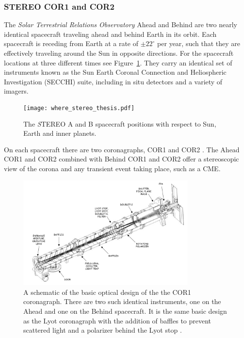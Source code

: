 \subsubsection{STEREO COR1 and COR2}\label{sec:22}
The \emph{Solar Terrestrial Relations Observatory} \citep[\emph{STEREO};][]{kai08} Ahead and Behind are two nearly identical spacecraft traveling ahead and behind Earth in its orbit. Each spacecraft is receding from Earth at a rate of $\pm22^{\circ}$ per year, such that they are effectively traveling around the Sun in opposite directions. For the spacecraft locations at three different times see Figure~\ref{fig:where_str}. They carry an identical set of instruments known as the Sun Earth Coronal Connection and Heliospheric Investigation (SECCHI) suite, including in situ detectors and a variety of imagers.
\begin{figure}
\centering
\texttt{[image: where\_stereo\_thesis.pdf]}
\caption[STEREO spacecraft positions]{The {\emph STEREO} A and B spacecraft positions with respect to Sun, Earth and inner planets.}
\label{fig:where_str}
\end{figure}
On each spacecraft there are two coronagraphs, COR1 and COR2 \citep{how08}. The Ahead COR1 and COR2 combined with Behind COR1 and COR2 offer a stereoscopic view of the corona and any transient event taking place, such as a CME.
\begin{figure}[!t]
\begin{center}
\includegraphics[width=0.8\textwidth]{images/COR1_design}
\caption[The COR1 coronagraph]{A schematic of the basic optical design of the the COR1 coronagraph. There are two such identical instruments, one on the Ahead and one on the Behind spacecraft. It is the same basic design as the Lyot coronagraph with the addition of baffles to prevent scattered light and a polarizer behind the Lyot stop \citep{thomp2008}.}
\label{fig:COR1_design}
\end{center}
\end{figure}
